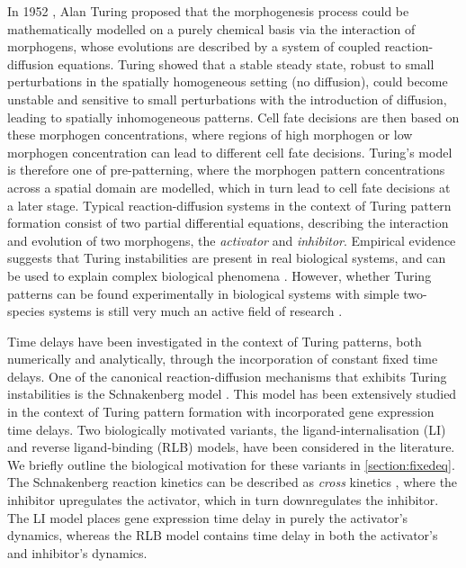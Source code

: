 In 1952 \cite{turing}, Alan Turing proposed that the morphogenesis process could be mathematically modelled on a purely chemical basis via the interaction of morphogens, whose evolutions are described by a system of coupled reaction-diffusion equations. Turing showed that a stable steady state, robust to small perturbations in the spatially homogeneous setting (no diffusion), could become unstable and sensitive to small perturbations with the introduction of diffusion, leading to spatially inhomogeneous patterns. Cell fate decisions are then based on these morphogen concentrations, where regions of high morphogen or low morphogen concentration can lead to different cell fate decisions. Turing's model is therefore one of pre-patterning, where the morphogen pattern concentrations across a spatial domain are modelled, which in turn lead to cell fate decisions at a later stage. Typical reaction-diffusion systems in the context of Turing pattern formation consist of two partial differential equations, describing the interaction and evolution of two morphogens, the \textit{activator} and \textit{inhibitor}. Empirical evidence suggests that Turing instabilities are present in real biological systems, and can be used to explain complex biological phenomena \cite{yigaffneyli,molecular,miura,miura2,sick}. However, whether Turing patterns can be found experimentally in biological systems with simple two-species systems is still very much an active field of research \cite{bespoke}.

Time delays have been investigated in the context of Turing patterns, both numerically and analytically, through the incorporation of constant fixed time delays. One of the canonical reaction-diffusion mechanisms that exhibits Turing instabilities is the Schnakenberg model \cite{schnakenberg}. This model has been extensively studied in the context of Turing pattern formation with incorporated gene expression time delays. Two biologically motivated variants, the ligand-internalisation (LI) and reverse ligand-binding (RLB) models, have been considered in the literature. We briefly outline the biological motivation for these variants in \ref{section:fixedeq}. The Schnakenberg reaction kinetics can be described as \textit{cross} kinetics \cite{leegaffney}, where the inhibitor upregulates the activator, which in turn downregulates the inhibitor. The LI model places gene expression time delay in purely the activator's dynamics, whereas the RLB model contains time delay in both the activator's and inhibitor's dynamics.


